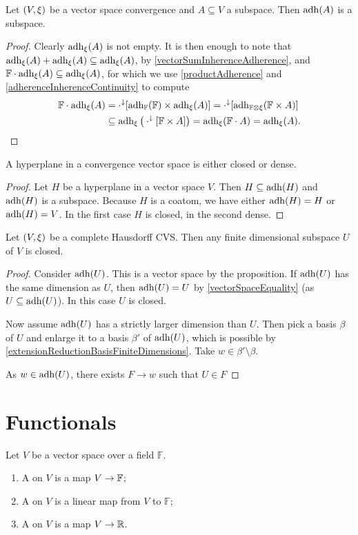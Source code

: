 \begin{proposition}
Let $\left( V,\xi \right)$ be a vector space convergence and $A\subseteq V$ a subspace. Then $\operatorname{adh}(A)$ is a subspace.
\end{proposition}
\begin{proof}
Clearly $\operatorname{adh}_\xi(A)$ is not empty. It is then enough to note that $\operatorname{adh}_\xi(A)+\operatorname{adh}_\xi(A)\subseteq \operatorname{adh}_\xi(A)$, by \ref{vectorSumInherenceAdherence}, and $\mathbb{F}\cdot \operatorname{adh}_\xi(A) \subseteq \operatorname{adh}_\xi(A)$, for which we use \ref{productAdherence} and \ref{adherenceInherenceContinuity} to compute
\begin{align*}
\mathbb{F}\cdot \operatorname{adh}_\xi(A) &= \cdot^\downarrow[\operatorname{adh}_{\mathbb{F}}(\mathbb{F})\times \operatorname{adh}_\xi(A)] = \cdot^\downarrow[\operatorname{adh}_{\mathbb{F}\otimes \xi}(\mathbb{F}\times A)] \\
&\subseteq \operatorname{adh}_{\xi}\big(\cdot^\downarrow[\mathbb{F}\times A]\big) = \operatorname{adh}_{\xi}(\mathbb{F}\cdot A) = \operatorname{adh}_\xi(A).
\end{align*}
\end{proof}
\begin{corollary} \label{hyperplaneClosedDense}
A hyperplane in a convergence vector space is either closed or dense.
\end{corollary}
\begin{proof}
Let $H$ be a hyperplane in a vector space $V$. Then $H \subseteq \operatorname{adh}(H)$ and $\operatorname{adh}(H)$ is a subspace. Because $H$ is a coatom, we have either $\operatorname{adh}(H) = H$ or $\operatorname{adh}(H) = V$. In the first case $H$ is closed, in the second dense.
\end{proof}
\begin{corollary}
Let $\left( V,\xi \right)$ be a complete Hausdorff CVS. Then any finite dimensional subspace $U$ of $V$ is closed.
\end{corollary}
\begin{proof}
Consider $\operatorname{adh}(U)$. This is a vector space by the proposition. If $\operatorname{adh}(U)$ has the same dimension as $U$, then $\operatorname{adh}(U) = U$ by \ref{vectorSpaceEquality} (as $U \subseteq \operatorname{adh}(U)$). In this case $U$ is closed.

Now assume $\operatorname{adh}(U)$ has a strictly larger dimension than $U$. Then pick a basis $\beta$ of $U$ and enlarge it to a basis $\beta'$ of $\operatorname{adh}(U)$, which is possible by \ref{extensionReductionBasisFiniteDimensions}. Take $w\in \beta'\setminus \beta$.

As $w\in\operatorname{adh}(U)$, there exists $F\to w$ such that $U\in F$
\end{proof}

\section{Functionals}
\begin{definition}
Let $V$ be a vector space over a field $\mathbb{F}$.
\begin{enumerate}
\item A  on $V$ is a map $V\to \mathbb{F}$;
\item A  on $V$ is a linear map from $V$ to $\mathbb{F}$;
\item A  on $V$ is a map $V\to \mathbb{R}$.
\end{enumerate}
\end{definition}

